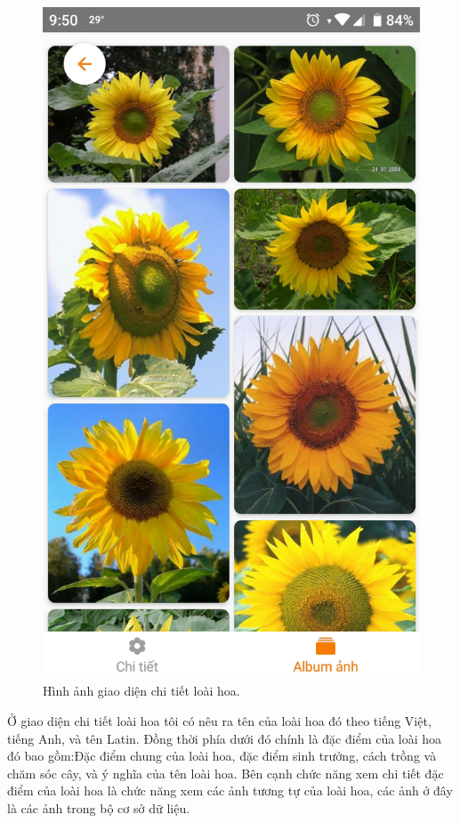\documentclass[12pt]{report}
\begin{document}
\begin{figure}[h]
			\includegraphics[scale=0.18]{app_detail2}
			\caption{Hình ảnh giao diện chi tiết loài hoa.}
			\label{fig:app_detail}
		\end{figure}
		
		Ở giao diện chi tiết loài hoa tôi có nêu ra tên của loài hoa đó theo tiếng Việt, tiếng Anh, và tên Latin. Đồng thời phía dưới đó chính là đặc điểm của loài hoa đó bao gồm:Đặc điểm chung của loài hoa, đặc điểm sinh trưởng, cách trồng và chăm sóc cây, và ý nghĩa của tên loài hoa.
		Bên cạnh chức năng xem chi tiết đặc điểm của loài hoa là chức năng xem các ảnh tương tự của loài hoa, các ảnh ở đây là các ảnh trong bộ cơ sở dữ liệu.
		\newpage
		
\end{document}
